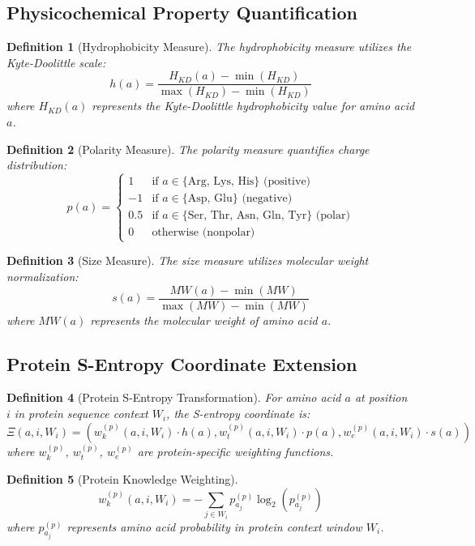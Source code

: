 \documentclass[12pt,a4paper]{article}
\newtheorem{definition}{Definition}
\begin{document}
\subsection{Physicochemical Property Quantification}

\begin{definition}[Hydrophobicity Measure]
The hydrophobicity measure utilizes the Kyte-Doolittle scale:
$$h(a) = \frac{H_{KD}(a) - \min(H_{KD})}{\max(H_{KD}) - \min(H_{KD})}$$
where $H_{KD}(a)$ represents the Kyte-Doolittle hydrophobicity value for amino acid $a$.
\end{definition}

\begin{definition}[Polarity Measure]
The polarity measure quantifies charge distribution:
$$p(a) = \begin{cases}
1 & \text{if } a \in \{\text{Arg, Lys, His}\} \text{ (positive)} \\
-1 & \text{if } a \in \{\text{Asp, Glu}\} \text{ (negative)} \\
0.5 & \text{if } a \in \{\text{Ser, Thr, Asn, Gln, Tyr}\} \text{ (polar)} \\
0 & \text{otherwise (nonpolar)}
\end{cases}$$
\end{definition}

\begin{definition}[Size Measure]
The size measure utilizes molecular weight normalization:
$$s(a) = \frac{MW(a) - \min(MW)}{\max(MW) - \min(MW)}$$
where $MW(a)$ represents the molecular weight of amino acid $a$.
\end{definition}

\subsection{Protein S-Entropy Coordinate Extension}

\begin{definition}[Protein S-Entropy Transformation]
For amino acid $a$ at position $i$ in protein sequence context $W_i$, the S-entropy coordinate is:
$$\Xi(a,i,W_i) = (w_k^{(p)}(a,i,W_i) \cdot h(a), w_t^{(p)}(a,i,W_i) \cdot p(a), w_e^{(p)}(a,i,W_i) \cdot s(a))$$
where $w_k^{(p)}$, $w_t^{(p)}$, $w_e^{(p)}$ are protein-specific weighting functions.
\end{definition}

\begin{definition}[Protein Knowledge Weighting]
$$w_k^{(p)}(a,i,W_i) = -\sum_{j \in W_i} p_{a_j}^{(p)} \log_2(p_{a_j}^{(p)})$$
where $p_{a_j}^{(p)}$ represents amino acid probability in protein context window $W_i$.
\end{definition}
\end{document}
